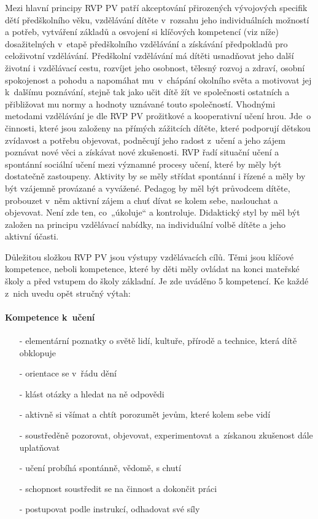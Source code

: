 				Mezi hlavní principy RVP PV patří akceptování přirozených vývojových specifik dětí předškolního věku, vzdělávání dítěte v rozsahu jeho individuálních možností a potřeb, vytváření základů a osvojení si klíčových kompetencí (viz níže) dosažitelných v etapě předškolního vzdělávání a získávání předpokladů pro celoživotní vzdělávání.
				Předškolní vzdělávání má dítěti usnadňovat jeho další životní i vzdělávací cestu, rozvíjet jeho osobnost, tělesný rozvoj a zdraví, osobní spokojenost a pohodu a napomáhat mu v chápání okolního světa a motivovat jej k dalšímu poznávání, stejně tak jako učit dítě žít ve společnosti ostatních a přibližovat mu normy a hodnoty uznávané touto společností.
				Vhodnými metodami vzdělávání je dle RVP PV prožitkové a kooperativní učení hrou. Jde o činnosti, které jsou založeny na přímých zážitcích dítěte, které podporují dětskou zvídavost a potřebu objevovat, podněcují jeho radost z učení a jeho zájem poznávat nové věci a získávat nové zkušenosti.
				RVP řadí situační učení a spontánní sociální učení mezi významné procesy učení, které by měly být dostatečně zastoupeny. Aktivity by se měly střídat spontánní i řízené a měly by být vzájemně provázané a vyvážené. Pedagog by měl být průvodcem dítěte, probouzet v něm aktivní zájem a chuť dívat se kolem sebe, naslouchat a objevovat. Není zde ten, co „úkoluje“ a kontroluje. Didaktický styl by měl být založen na principu vzdělávací nabídky, na individuální volbě dítěte a jeho aktivní účasti.
				

				Důležitou složkou RVP PV jsou výstupy vzdělávacích cílů. Těmi jsou klíčové kompetence, neboli kompetence, které by děti měly ovládat na konci mateřské školy a před vstupem do školy základní. Je zde uváděno 5 kompetencí. Ke každé z nich uvedu opět stručný výtah:

				\paragraph{Kompetence k učení}
				\begin{itemize}
				\setlength\itemsep{-2mm}
				\item[-] elementární poznatky o světě lidí, kultuře, přírodě a technice, která dítě obklopuje
				\item[-] orientace se v řádu dění
				\item[-] klást otázky a hledat na ně odpovědi
				\item[-] aktivně si všímat a chtít porozumět jevům, které kolem sebe vidí
				\item[-] soustředěně pozorovat, objevovat, experimentovat a získanou zkušenost dále uplatňovat
				\item[-] učení probíhá spontánně, vědomě, s chutí
				\item[-] schopnost soustředit se na činnost a dokončit práci
				\item[-] postupovat podle instrukcí, odhadovat své síly 
				\end{itemize}
				

